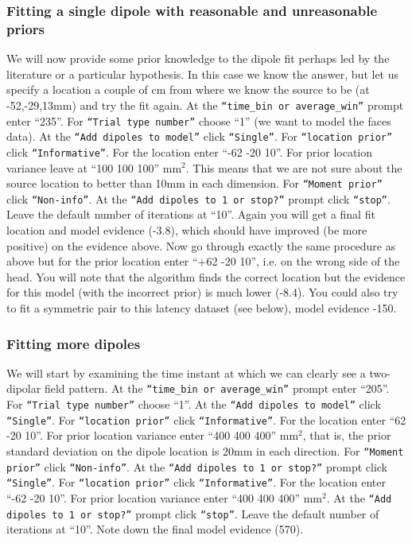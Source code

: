 \subsubsection{Fitting a single dipole with reasonable and unreasonable priors}
We will now provide some prior knowledge to the dipole fit perhaps led by the literature or a particular hypothesis. In this case we know the answer, but let us specify a location a couple of cm from where we know the source to be (at -52,-29,13mm) and try the fit again.
At the  \texttt{``time\_bin or average\_win''} prompt enter ``235''. For  \texttt{``Trial type number''} choose ``1'' (we want to model the faces data). At the  \texttt{``Add dipoles to model''} click  \texttt{``Single''}. For  \texttt{``location prior''} click  \texttt{``Informative''}. For the location enter ``-62 -20 10''. For prior location variance leave at ``100 100 100'' mm$^2$. This means that we are not sure about the source location to better than 10mm in each dimension. For  \texttt{``Moment prior''} click  \texttt{``Non-info''}. At the  \texttt{``Add dipoles to 1 or stop?''} prompt click  \texttt{``stop''}. Leave the default number of iterations at ``10''. Again you will get a final fit location and model evidence (-3.8), which should have improved (be more positive) on the evidence above. 
Now go through exactly the same procedure as above but for the prior location enter ``+62 -20 10'', i.e. on the wrong side of the head. You will note that the algorithm finds the correct location but the evidence for this model (with the incorrect prior) is much lower (-8.4). You could also try to fit a symmetric pair to this latency dataset (see below), model evidence -150.

\subsubsection{Fitting more dipoles}
We will start by examining the time instant at which we can clearly see a two-dipolar field pattern.
At the \texttt{``time\_bin or average\_win''} prompt enter ``205''. For \texttt{``Trial type number''} choose ``1''. At the \texttt{``Add dipoles to model''} click \texttt{``Single''}. For \texttt{``location prior''} click \texttt{``Informative''}. For the location enter ``62 -20 10''. For prior location variance enter ``400 400 400'' mm$^2$, that is, the prior standard deviation on the dipole location is 20mm in each direction. For \texttt{``Moment prior''} click \texttt{``Non-info''}. At the \texttt{``Add dipoles to 1 or stop?''} prompt click \texttt{``Single''}. For \texttt{``location prior''} click \texttt{``Informative''}. For the location enter ``-62 -20 10''. For prior location variance enter ``400 400 400'' mm$^2$. At the \texttt{``Add dipoles to 1 or stop?''} prompt click \texttt{``stop''}. Leave the default number of iterations at ``10''. Note down the final model evidence (570). 


